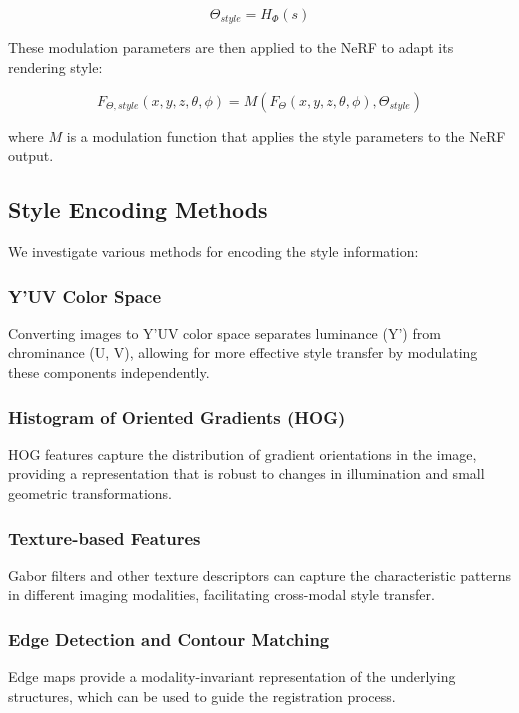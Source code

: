 \begin{equation}
\Theta_{style} = H_\Phi(s)
\end{equation}

These modulation parameters are then applied to the NeRF to adapt its rendering style:

\begin{equation}
F_{\Theta, style}(x, y, z, \theta, \phi) = M(F_\Theta(x, y, z, \theta, \phi), \Theta_{style})
\end{equation}

where $M$ is a modulation function that applies the style parameters to the NeRF output.

\subsection{Style Encoding Methods}
We investigate various methods for encoding the style information:

\subsubsection{Y'UV Color Space}
Converting images to Y'UV color space separates luminance (Y') from chrominance (U, V), allowing for more effective style transfer by modulating these components independently.

\subsubsection{Histogram of Oriented Gradients (HOG)}
HOG features capture the distribution of gradient orientations in the image, providing a representation that is robust to changes in illumination and small geometric transformations.

\subsubsection{Texture-based Features}
Gabor filters and other texture descriptors can capture the characteristic patterns in different imaging modalities, facilitating cross-modal style transfer.

\subsubsection{Edge Detection and Contour Matching}
Edge maps provide a modality-invariant representation of the underlying structures, which can be used to guide the registration process.

